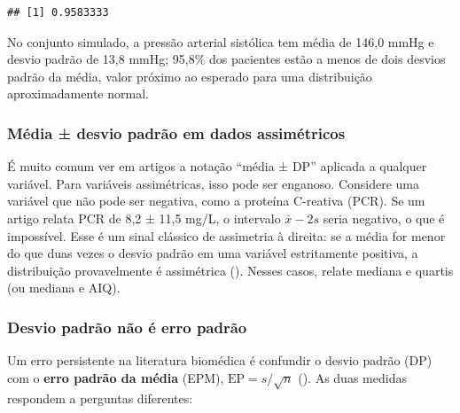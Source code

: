 \documentclass[
]{book}
\newenvironment{Shaded}{\begin{snugshade}}{\end{snugshade}}
\newcommand{\DecValTok}[1]{\textcolor[rgb]{0.00,0.00,0.81}{#1}}
\newcommand{\FunctionTok}[1]{\textcolor[rgb]{0.13,0.29,0.53}{\textbf{#1}}}
\newcommand{\NormalTok}[1]{#1}
\newcommand{\OtherTok}[1]{\textcolor[rgb]{0.56,0.35,0.01}{#1}}
\newcommand{\SpecialCharTok}[1]{\textcolor[rgb]{0.81,0.36,0.00}{\textbf{#1}}}
\begin{document}
\begin{Shaded}
\end{Shaded}

\begin{verbatim}
## [1] 0.9583333
\end{verbatim}

No conjunto simulado, a pressão arterial sistólica tem média de 146,0 mmHg e desvio padrão de 13,8 mmHg; 95,8\% dos pacientes estão a menos de dois desvios padrão da média, valor próximo ao esperado para uma distribuição aproximadamente normal.

\subsubsection{Média ± desvio padrão em dados assimétricos}\label{muxe9dia-desvio-padruxe3o-em-dados-assimuxe9tricos}

É muito comum ver em artigos a notação ``média ± DP'' aplicada a qualquer variável. Para variáveis assimétricas, isso pode ser enganoso. Considere uma variável que não pode ser negativa, como a proteína C-reativa (PCR). Se um artigo relata PCR de 8,2 ± 11,5 mg/L, o intervalo \(\bar{x} - 2s\) seria negativo, o que é impossível. Esse é um sinal clássico de assimetria à direita: se a média for menor do que duas vezes o desvio padrão em uma variável estritamente positiva, a distribuição provavelmente é assimétrica (). Nesses casos, relate mediana e quartis (ou mediana e AIQ).

\subsubsection{Desvio padrão não é erro padrão}\label{desvio-padruxe3o-nuxe3o-uxe9-erro-padruxe3o}

Um erro persistente na literatura biomédica é confundir o desvio padrão (DP) com o \textbf{erro padrão da média} (EPM), \(\text{EP} = s/\sqrt{n}\) (). As duas medidas respondem a perguntas diferentes:
\end{document}
